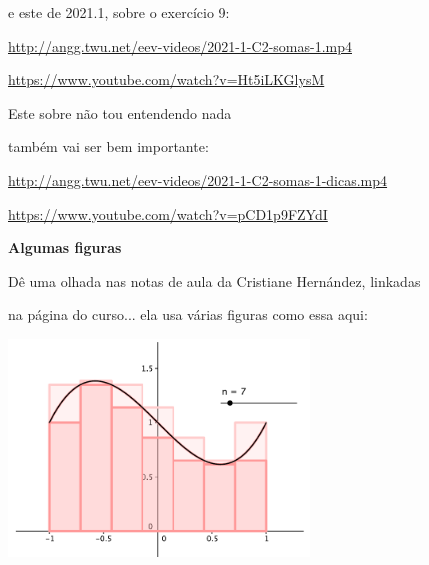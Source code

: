 \documentclass[oneside,12pt]{article}
\begin{document}
\msk

%
e este de 2021.1, sobre o exercício 9:

\ssk

{\footnotesize

\url{http://angg.twu.net/eev-videos/2021-1-C2-somas-1.mp4}

\url{https://www.youtube.com/watch?v=Ht5iLKGlysM}

}

\msk


Este sobre não tou entendendo nada

também vai ser bem importante:

\ssk

{\footnotesize

\url{http://angg.twu.net/eev-videos/2021-1-C2-somas-1-dicas.mp4}

\url{https://www.youtube.com/watch?v=pCD1p9FZYdI}

}







\newpage


{\bf Algumas figuras}

Dê uma olhada nas notas de aula da Cristiane Hernández, linkadas

na página do curso... ela usa várias figuras como essa aqui:


\includegraphics[width=8cm]{2020-1-C2/area-hernandez-1.png}


\newpage

\end{document}
